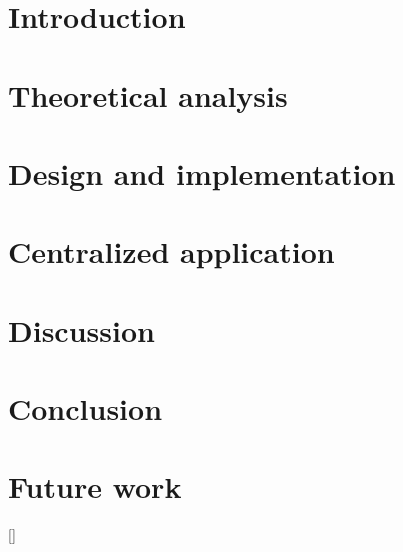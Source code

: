 \documentclass[bibliography=totoc, abstract=on]{scrartcl}
\begin{document}
\thispagestyle{plain}
\section{Introduction}





%

\pagebreak
\thispagestyle{plain}
\section{Theoretical analysis} \label{section:theoanalysis}





\pagebreak
\thispagestyle{plain}
\section{Design and implementation} \label{section:design}





\pagebreak
\thispagestyle{plain}
\section{Centralized application}



\pagebreak
\thispagestyle{plain}
\section{Discussion}



\pagebreak
\thispagestyle{plain}
\section{Conclusion}


\pagebreak
\thispagestyle{plain}
\section{Future work} \label{section:futurework}


\pagebreak

\titleformat{\section}{\sffamily\Large\bfseries}{\thesection}{1em}{\sffamily\Large\bfseries}[]

\fancyhead[RO,RE]{\uppercase{\slshape \leftmark}}



\pagebreak
\printbibliography[heading=bibintoc]
\end{document}
